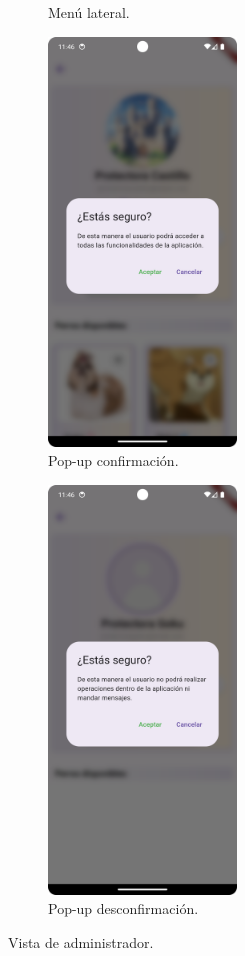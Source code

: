 \documentclass[a4paper, 12pt]{article}
\begin{document}
\begin{figure}[H]
\begin{subfigure}{0.48\textwidth}
\begin{center}
			\caption{Menú lateral.}
		\end{center}
	\end{subfigure}\hfill
   	\begin{subfigure}{0.48\textwidth}
		\begin{center}
			{\includegraphics[width=5cm]{app/AdminVerifyPopUp}\par}
			\caption{Pop-up confirmación.}
		\end{center}
	\end{subfigure}\hfill
   	\begin{subfigure}{0.48\textwidth}
		\begin{center}
			{\includegraphics[width=5cm]{app/AdminUnVerifyPopUp}\par}
			\caption{Pop-up desconfirmación.}
		\end{center}
	\end{subfigure}\hfill
	\caption{Vista de administrador.}
\end{figure}
\end{document}
